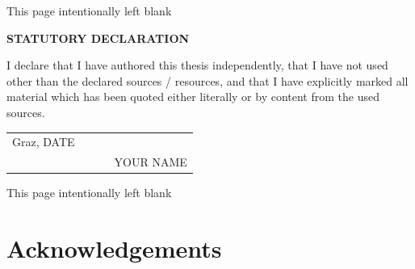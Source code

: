 {
%
%
%
\clearpage
\begin{center}
This page intentionally left blank
\end{center}
\clearpage



\pagestyle{plain}
\setcounter{page}{3}


\begin{center}
\textbf{STATUTORY DECLARATION}
\end{center}

\noindent
I declare that I have authored this thesis independently, that I have
not used other than the declared sources / resources, and that I have
explicitly marked all material which has been quoted either literally
or by content from the used sources.

\vspace{1cm}
\begin{flushleft}
\begin{tabular}{lclc}
Graz, DATE & {\hspace*{3cm}} & ~\hfill &  \underline{\hspace*{5cm}} \\
~\hfill & {\hspace*{3cm}} & ~\hfill &  YOUR NAME   \\
\end{tabular}
\end{flushleft}
\vspace{2cm}
\clearpage

\clearpage
\begin{center}
This page intentionally left blank
\end{center}
\clearpage

\section*{Acknowledgements}

}
